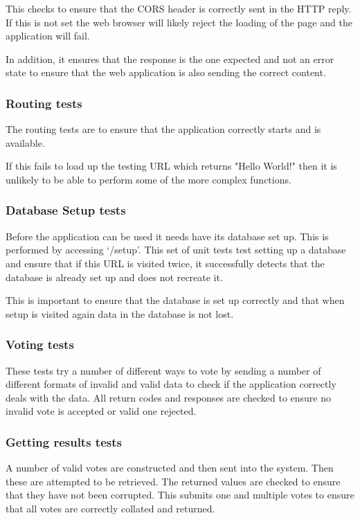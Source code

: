 This checks to ensure that the CORS header is correctly sent in the HTTP reply. If this is not set the web browser will likely reject the loading of the page and the application will fail.

In addition, it ensures that the response is the one expected and not an error state to ensure that the web application is also sending the correct content.

\subsubsection{Routing tests}

The routing tests are to ensure that the application correctly starts and is available.

If this fails to load up the testing URL which returns "Hello World!" then it is unlikely to be able to perform some of the more complex functions.

\subsubsection{Database Setup tests}

Before the application can be used it needs have its database set up. This is performed by accessing `/setup'. This set of unit tests test setting up a database and ensure that if this URL is visited twice, it successfully detects that the database is already set up and does not recreate it. 

This is important to ensure that the database is set up correctly and that when setup is visited again data in the database is not lost.

\subsubsection{Voting tests}

These tests try a number of different ways to vote by sending a number of different formats of invalid and valid data to check if the application correctly deals with the data. All return codes and responses are checked to ensure no invalid vote is accepted or valid one rejected.

\subsubsection{Getting results tests}

A number of valid votes are constructed and then sent into the system. Then these are attempted to be retrieved. The returned values are checked to ensure that they have not been corrupted. This submits one and multiple votes to ensure that all votes are correctly collated and returned.


